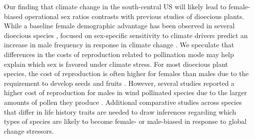 \documentclass[12pt]{article}\usepackage[]{graphicx}\usepackage[dvipsnames]{xcolor}
\begin{document}
Our finding that climate change in the south-central US will likely lead to female-biased operational sex ratios contrasts with previous studies of dioecious plants. 
While a baseline female demographic advantage has been observed in several dioecious species \citep{bawa1980evolution,zhao2012sex,sasaki2019complex}, focused on sex-specific sensitivity to climate drivers predict an increase in male frequency in response in climate change \citep{petry2016sex,hultine2016climate}. 
We speculate that differences in the costs of reproduction related to pollination mode may help explain which sex is favored under climate stress. 
For most dioecious plant species, the cost of reproduction is often higher for females than males due to the requirement to develop seeds and fruits \citep{hultine2016climate}. %
However, several studies reported a higher cost of reproduction for males in wind pollinated species due to the larger amounts of pollen they produce \citep{burli2022environmental,cipollini1994sexual,bruijning2017surviving,field2013comparative}. 
Additional comparative studies across species that differ in life history traits are needed to draw inferences regarding which types of species are likely to become female- or male-biased in response to global change stressors.
\end{document}
